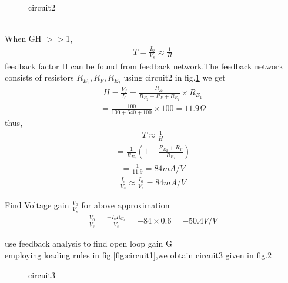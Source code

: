 \begin{enumerate}[label=\thesubsection.\arabic*.,ref=\thesubsection.\theenumi]
{\begin{figure}[!ht]
\begin{center}
		\resizebox{\columnwidth}{!}{}
	\end{center}
\caption{circuit2}
\label{fig:circuit2}
\end{figure}
\\
\solution When GH $>>$1,
\begin{align}
    T =\frac{I_0}{V_s}\approx \frac{1}{H}
\end{align}
feedback factor H can be found from feedback network.The feedback network consists of resistors $R_E_1,R_F,R_E_2$
using circuit2 in  fig.\ref{fig:circuit2} we get
\begin{align}
    H=\frac{V_f}{I_0}=\frac{R_E_2}{R_E_2+R_F+R_E_1} \times R_E_1
\end{align}
\begin{align}
    =\frac{100}{100+640+100}\times 100=11.9\Omega
\end{align}
thus,
\begin{align}
    T\approx \frac{1}{H}
\end{align}
\begin{align}
    =\frac{1}{R_E_2}(1+\frac{R_E_2+R_F}{R_E_1})
\end{align}
\begin{align}
    =\frac{1}{11.9}=84mA/V
\end{align}
\begin{align}
\label{eq:eq1}
    \frac{I_c}{V_s}\approx\frac{I_0}{V_s}=84 mA/V
\end{align}
\item Find Voltage gain $\frac{V_0}{V_s}$ for above approximation
\\
\solution 
\begin{align}
\frac{V_0}{V_s}=\frac{-I_c R_C_3}{V_s}=-84\times0.6=-50.4V/V
\end{align}
\item use feedback analysis to find open loop gain G 
\\
\solution employing loading rules in fig.\ref{fig:circuit1},we obtain circuit3 given in fig.\ref{fig:circuit3}
 \begin{figure}[!ht]
	\begin{center}
		
		\resizebox{\columnwidth}{!}{}
	\end{center}
\caption{circuit3}
\label{fig:circuit3}
\end{figure}
\begin{figure}[!ht]
	\begin{center}
		

\end{center}
\end{figure}}
\end{enumerate}
